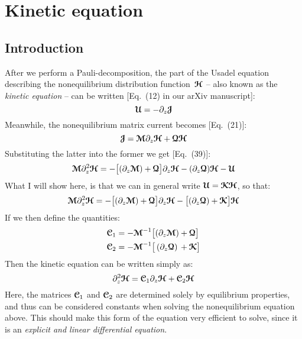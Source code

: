 \chapter{Kinetic equation}
\section{Introduction}
After we perform a Pauli-decomposition, the part of the Usadel equation describing the nonequilibrium distribution function~$\bm{\mathcal{H}}$ -- also known as the \emph{kinetic equation} -- can be written [Eq.~(12) in our arXiv manuscript]:
\begin{equation}
  \bm{\mathcal{U}} = -\partial_z \bm{\mathcal{J}}
\end{equation}
Meanwhile, the nonequilibrium matrix current becomes [Eq.~(21)]:
\begin{equation}
  \bm{\mathcal{J}} = \bm{\mathcal{M}}\partial_z\bm{\mathcal{H}} + \bm{\mathcal{Q}}\bm{\mathcal{H}}
\end{equation}
Substituting the latter into the former we get [Eq.~(39)]:
\begin{equation}
  \bm{\mathcal{M}} \partial_z^2 \bm{\mathcal{H}} = -\big[ (\partial_z\bm{\mathcal{M}}) + \bm{\mathcal{Q}} \big] \partial_z \bm{\mathcal{H}} - (\partial_z \bm{\mathcal{Q}}) \bm{\mathcal{H}} - \bm{\mathcal{U}}
\end{equation}
What I will show here, is that we can in general write $\bm{\mathcal{U}} = \bm{\mathcal{K}} \bm{\mathcal{H}}$, so that:
\begin{equation}
  \bm{\mathcal{M}} \partial_z^2 \bm{\mathcal{H}} = -\big[ (\partial_z\bm{\mathcal{M}}) + \bm{\mathcal{Q}} \big] \partial_z \bm{\mathcal{H}} - \big[ (\partial_z \bm{\mathcal{Q}}) + \bm{\mathcal{K}} \big] \bm{\mathcal{H}}
\end{equation}
If we then define the quantities:
\begin{align}
  \bm{\mathcal{C}}_1 &= -\bm{\mathcal{M}}^{-1} \big[ (\partial_z\bm{\mathcal{M}}) + \bm{\mathcal{Q}} \big] \\
  \bm{\mathcal{C}}_2 &= -\bm{\mathcal{M}}^{-1} \big[ \, (\partial_z\bm{\mathcal{Q}}) \,+ \bm{\mathcal{K}} \big]
\end{align}
Then the kinetic equation can be written simply as:
\begin{equation}
  \partial_z^2 \bm{\mathcal{H}} = \bm{\mathcal{C}}_1 \partial_z \bm{\mathcal{H}} + \bm{\mathcal{C}}_2 \bm{\mathcal{H}}
\end{equation}
Here, the matrices $\bm{\mathcal{C}}_1$ and $\bm{\mathcal{C}}_2$ are determined solely by equilibrium properties, and thus can be considered constants when solving the nonequilibrium equation above.
This should make this form of the equation very efficient to solve, since it is an \emph{explicit and linear differential equation}.

\clearpage
